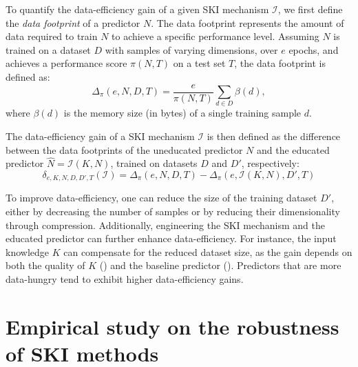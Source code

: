 %
To quantify the data-efficiency gain of a given \gls{SKI} mechanism \(\mathcal{I}\), we first define the \emph{data footprint} of a predictor \(N\).
%
The data footprint represents the amount of data required to train \(N\) to achieve a specific performance level.
%
Assuming \(N\) is trained on a dataset \(D\) with samples of varying dimensions, over \(e\) epochs, and achieves a performance score \(\pi(N, T)\) on a test set \(T\), the data footprint is defined as:
%
\begin{equation}
    \label{eq:data-footprint}
    \Delta_\pi(e, N, D, T) = \frac{e}{\pi(N, T)} \sum_{d \in D} \beta(d),
\end{equation}
%
where \(\beta(d)\) is the memory size (in bytes) of a single training sample \(d\).

%
The data-efficiency gain of a \gls{SKI} mechanism \(\mathcal{I}\) is then defined as the difference between the data footprints of the uneducated predictor \(N\) and the educated predictor \(\hat{N} = \mathcal{I}(K, N)\), trained on datasets \(D\) and \(D'\), respectively:
%
\begin{equation}
    \label{eq:data-efficiency-gain}
    \delta_{e, K, N, D, D', T}(\mathcal{I}) = \Delta_\pi(e, N, D, T) - \Delta_\pi(e, \mathcal{I}(K, N), D', T)
\end{equation}

%
To improve data-efficiency, one can reduce the size of the training dataset \(D'\), either by decreasing the number of samples or by reducing their dimensionality through compression.
%
Additionally, engineering the \gls{SKI} mechanism and the educated predictor can further enhance data-efficiency.
%
For instance, the input knowledge \(K\) can compensate for the reduced dataset size, as the gain depends on both the quality of \(K\) () and the baseline predictor ().
%
Predictors that are more data-hungry tend to exhibit higher data-efficiency gains.


\section[Empirical study on the robustness of SKI methods]{Empirical study on the robustness of \Gls{SKI} methods}\label{sec:empirical-study-on-the-robustness-of-ski-methods}
%
